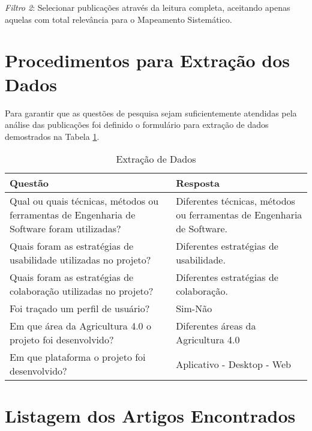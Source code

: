 \documentclass[12pt]{article}
\begin{document}
\noindent\textit{Filtro 2}: Selecionar publicações através da leitura completa, aceitando apenas aquelas com total relevância para o Mapeamento Sistemático. 

\section{Procedimentos para Extração dos Dados}

Para garantir que as questões de pesquisa sejam suficientemente atendidas pela análise das publicações foi definido o formulário para extração de dados demostrados na Tabela \ref{tab:extracao}.

\begin{table}[!htb]
	\footnotesize
  \centering
	\begin{tabular}{|p{8cm}|p{6cm}|}
		\hline
		\textbf{Questão}                                                                           & \textbf{Resposta}                                                      \\ \hline
		Qual ou quais técnicas, métodos ou ferramentas de Engenharia de Software foram utilizadas? & Diferentes técnicas, métodos ou ferramentas de Engenharia de Software. \\ \hline
		Quais foram as estratégias de usabilidade utilizadas no projeto?                           & Diferentes estratégias de usabilidade.                                 \\ \hline
		Quais foram as estratégias de colaboração utilizadas no projeto?                           & Diferentes estratégias de colaboração.                                 \\ \hline
		Foi traçado um perfil de usuário?                                                          & Sim-Não                                                                \\ \hline
		Em que área da Agricultura 4.0 o projeto foi desenvolvido?                                 & Diferentes áreas da Agricultura 4.0                                    \\ \hline
		Em que plataforma o projeto foi desenvolvido?                                              & Aplicativo - Desktop - Web                                 \\ \hline
		\end{tabular}
  \caption{Extração de Dados}
  \label{tab:extracao}
\end{table}

\section{Listagem dos Artigos Encontrados}
\end{document}
